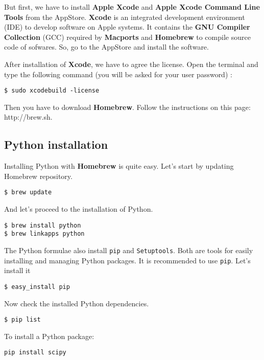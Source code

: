 \documentclass[a4paper, 11pt]{article}
\begin{document}
\begin{description}
But first, we have to install \textbf{Apple Xcode} and \textbf{Apple Xcode Command Line Tools} from the AppStore. \textbf{Xcode} is an integrated development environment (IDE) to develop software on Apple systems. It contains the \textbf{GNU Compiler Collection} (GCC) required by \textbf{Macports} and \textbf{Homebrew} to compile source code of sofwares. So, go to the AppStore and install the software.

After installation of \textbf{Xcode}, we have to agree the license. Open the terminal and type the following command (you will be asked for your user password) :

\begin{verbatim}
$ sudo xcodebuild -license
\end{verbatim}

Then you have to download \textbf{Homebrew}. Follow the instructions on this page: http://brew.sh.

\subsection*{Python installation}

Installing Python with \textbf{Homebrew} is quite easy. Let's start by updating Homebrew repository.

\begin{verbatim}
$ brew update
\end{verbatim}

And let's proceed to the installation of Python.

\begin{verbatim}
$ brew install python
$ brew linkapps python
\end{verbatim}

The Python formulae also install \texttt{pip} and \texttt{Setuptools}. Both are tools for easily installing and managing Python packages. It is recommended to use \texttt{pip}. Let's install it

\begin{verbatim}
$ easy_install pip
\end{verbatim}

Now check the installed Python dependencies.

\begin{verbatim}
$ pip list
\end{verbatim}

To install a Python package:

\begin{verbatim}
pip install scipy
\end{verbatim}


\end{description}
\end{document}
